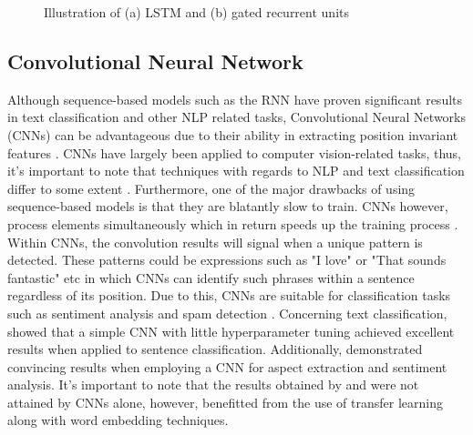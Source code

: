 \begin{figure}[H]
  \centering
  \qquad
  \caption{Illustration of (a) LSTM and (b) gated recurrent units}%
  \label{fig:LSTM-GRU}%
  \citep{gru}
\end{figure}

\subsection{Convolutional Neural Network}

Although sequence-based models such as the RNN have proven significant results in text classification and other NLP related tasks, Convolutional Neural Networks (CNNs) can be advantageous due to their ability in extracting position invariant features \citep{CNNvsRNN}. CNNs have largely been applied to computer vision-related tasks, thus, it's important to note that techniques with regards to NLP and text classification differ to some extent \citep{DBLP:journals/corr/0001KYS17}.  
Furthermore, one of the major drawbacks of using sequence-based models is that they are blatantly slow to train. CNNs however, process elements simultaneously which in return speeds up the training process \citep{ghelani_2019}. Within CNNs, the convolution results will signal when a unique pattern is detected. These patterns could be expressions such as "I love" or "That sounds fantastic" etc in which CNNs can identify such phrases within a sentence regardless of its position. Due to this, CNNs are suitable for classification tasks such as sentiment analysis and spam detection \citep{ghelani_2019}. Concerning text classification, \citep{kim-2014-convolutional} showed that a simple CNN with little hyperparameter tuning achieved excellent results when applied to sentence classification. Additionally, \citep{1609.02748} demonstrated convincing results when employing a CNN for aspect extraction and sentiment analysis. It's important to note that the results obtained by \citep{kim-2014-convolutional} and \citep{1609.02748}  were not attained by CNNs alone, however, benefitted from the use of transfer learning along with word embedding techniques. 


